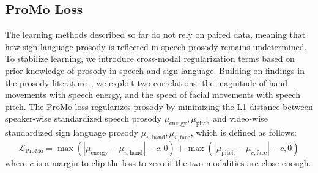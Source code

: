 \subsection{ProMo Loss}
\label{sec:PGR}
The learning methods described so far do not rely on paired data, 
meaning that how sign language prosody is reflected in speech prosody remains undetermined. 
To stabilize learning, we introduce cross-modal regularization terms 
based on prior knowledge of prosody in speech and sign language. 
Building on findings in the prosody literature~\cite{Wilbur1999,Limousin2010}, we exploit two correlations: the magnitude of hand movements with speech energy, and the speed of facial movements with speech pitch.
The ProMo loss regularizes prosody by minimizing the L1 distance between speaker-wise standardized speech prosody $\mu_{\mathrm{energy}}, \mu_{\mathrm{pitch}}$ and video-wise standardized sign language prosody $\mu_{v, \mathrm{hand}}, \mu_{v, \mathrm{face}}$,
which is defined as follows:
\begin{equation}\label{eq:pro_mo}
    \mathcal{L}_{\mathrm{ProMo}}=\max\left(\left|\mu_{\mathrm{energy}} - \mu_{v, \mathrm{hand}}\right| - c, 0\right) + \max\left(\left|\mu_{\mathrm{pitch}} - \mu_{v, \mathrm{face}}\right| - c, 0 \right)
\end{equation}
where $c$ is a margin to clip the loss to zero if the two modalities are close enough.


